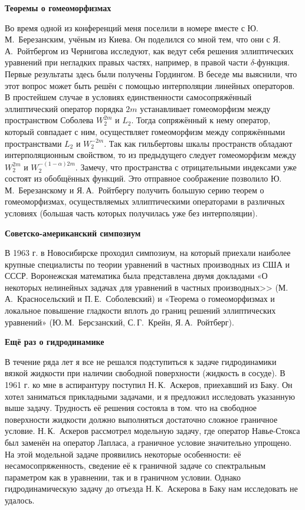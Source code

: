 {\bf Теоремы о гомеоморфизмах}

Во время одной из конференций меня поселили в номере вместе с Ю.\,М.~Березанским, учёным из Киева. Он поделился со мной тем, что они с Я.\,А.~Ройтбергом из Чернигова исследуют, как ведут себя решения эллиптических уравнений при негладких правых частях, например, в правой части $\delta$-функция. Первые результаты здесь были получены Гордингом. В беседе мы выяснили, что этот вопрос может быть решён с помощью интерполяции линейных операторов. В простейшем случае в условиях единственности самосопряжённый эллиптический оператор порядка $2m$ устанавливает гомеоморфизм между пространством Соболева $W_2^{2m}$ и $L_2$. Тогда сопряжённый к нему оператор, который совпадает с ним, осуществляет гомеоморфизм между сопряжёнными пространствами $L_2$ и $W_2^{-2m}$. Так как гильбертовы шкалы пространств обладают интерполяционным свойством, то из предыдущего следует гомеоморфизм между $W_2^{2m}$ и $W_2^{-(1-\alpha)2m}$. Замечу, что пространства с отрицательными индексами уже состоят из обобщённых функций. Это отправное соображение позволило Ю.\,М.~Березанскому и Я.\,А.~Ройтбергу получить большую серию теорем о гомеоморфизмах, осуществляемых эллиптическими операторами в различных условиях (большая часть которых получилась уже без интерполяции).

{\bf Советско-американский симпозиум}

В 1963 г. в Новосибирске проходил симпозиум,
на который приехали наиболее крупные специалисты по теории уравнений в частных производных из США и СССР.
Воронежская математика была представлена двумя докладами «О некоторых нелинейных задачах для уравнений в частных производных>>
(М.\,А.~Красносельский и П.\,Е.~Соболевский) и «Теорема о гомеоморфизмах и локальное повышение гладкости вплоть до границ решений эллиптических уравнений»
 (Ю.\,М.~Берсзанский, С.\,Г.~Крейн, Я.\,А.~Ройтберг).

{\bf Ещё раз о гидродинамике}

В течение ряда лет я все не решался подступиться к задаче гидродинамики вязкой жидкости при наличии свободной поверхности (жидкость в сосуде). В 1961 г. ко мне в аспирантуру поступил Н.\,К.~Аскеров, приехавший из Баку. Он хотел заниматься прикладными задачами, и я предложил исследовать указанную выше задачу. Трудность её решения состояла в том. что на свободное поверхности жидкости должно выполняться достаточно сложное граничное условие. Н.\,К.~Аскеров рассмотрел модельную задачу, где оператор Навье-Стокса был заменён на оператор Лапласа, а граничное условие значительно упрощено. На этой модельной задаче проявились некоторые особенности: её несамосопряженность, сведение её к граничной задаче со спектральным параметром как в уравнении, так и в граничном условии. Однако гидродинамическую задачу до отъезда Н.\,К.~Аскерова в Баку нам исследовать не удалось.

